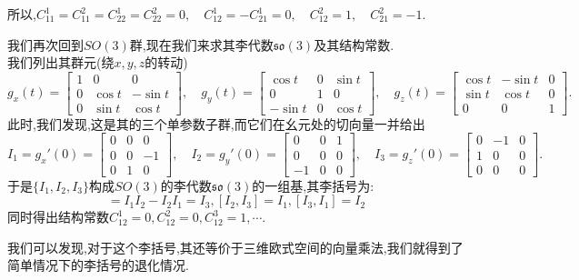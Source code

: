 \begin{example}
\begin{equation}
	\end{equation}
	所以,$C_{11}^1=C_{11}^2=C_{22}^1=C_{22}^2=0,\quad C_{12}^1=-C_{21}^1=0,\quad C_{12}^2=1,\quad C_{21}^2=-1.$
\end{example}
\begin{example}
	我们再次回到$SO(3)$群,现在我们来求其李代数$\mathfrak{so}(3)$及其结构常数.\\
	我们列出其群元(绕$x,y,z$的转动)
	\begin{equation}
		g_{x}(t)=\begin{bmatrix}1&0&0\\0&\cos t&-\sin t\\0&\sin t&\cos t\end{bmatrix},\quad g_y(t)=\begin{bmatrix}\cos t&0&\sin t\\0&1&0\\-\sin t&0&\cos t\end{bmatrix},\quad g_{z}(t)=\begin{bmatrix}\cos t&-\sin t&0\\\sin t&\cos t&0\\0&0&1\end{bmatrix}.
	\end{equation}
	此时,我们发现,这是其的三个单参数子群,而它们在幺元处的切向量一并给出
	\begin{equation}
		I_{1}=g_{x}'(0)=\begin{bmatrix}0&0&0\\0&0&-1\\0&1&0\end{bmatrix},\quad I_{2}=g_{y}'(0)=\begin{bmatrix}0&0&1\\0&0&0\\-1&0&0\end{bmatrix},\quad I_{3}=g_{z}'(0)=\begin{bmatrix}0&-1&0\\1&0&0\\0&0&0\end{bmatrix}.
	\end{equation}
	于是$\{I_1,I_2,I_3\}$构成$SO(3)$的李代数$\mathfrak{so}(3)$的一组基,其李括号为:
	\begin{equation}
		[I_1,I_2]=I_1I_2-I_2I_1=I_3,[I_2,I_3]=I_1,[I_3,I_1]=I_2
	\end{equation}
	同时得出结构常数$C_{12}^{ 1}=0,C_{12}^{ 2}=0,C_{12}^{ 3}=1,\cdots.$
	
	我们可以发现,对于这个李括号,其还等价于三维欧式空间的向量乘法,我们就得到了简单情况下的李括号的退化情况.
\end{example}

